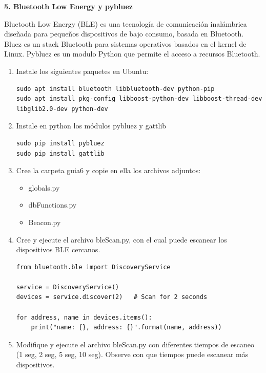 \documentclass[10pt,letterpaper]{article}
\begin{document}
\begin{center}
\textbf{5. Bluetooth Low Energy y pybluez}
\end{center}
Bluetooth Low Energy (BLE) es una tecnología de comunicación inalámbrica diseñada para pequeños dispositivos de bajo consumo, basada en Bluetooth. Bluez es un stack Bluetooth para sistemas operativos basados en el kernel de Linux. Pybluez es un modulo Python que permite el acceso a recursos Bluetooth. 

\begin{enumerate}

\item Instale los siguientes paquetes en Ubuntu:

\begin{verbatim}
sudo apt install bluetooth libbluetooth-dev python-pip
sudo apt install pkg-config libboost-python-dev libboost-thread-dev libglib2.0-dev python-dev
\end{verbatim}


\item Instale en python los módulos pybluez y gattlib
\begin{verbatim}
sudo pip install pybluez
sudo pip install gattlib
\end{verbatim}

\item Cree la carpeta guia6 y copie en ella los archivos adjuntos:
\begin{itemize}
\item globals.py
\item dbFunctions.py
\item Beacon.py
\end{itemize}


\item Cree y ejecute el archivo bleScan.py, con el cual puede escanear los dispositivos BLE cercanos. 
\begin{lstlisting}[style=myCustomPythonStyle]
from bluetooth.ble import DiscoveryService

service = DiscoveryService()
devices = service.discover(2)   # Scan for 2 seconds

for address, name in devices.items():
    print("name: {}, address: {}".format(name, address))
\end{lstlisting}

\item Modifique y ejecute el archivo bleScan.py con diferentes tiempos de escaneo (1 seg, 2 seg, 5 seg, 10 seg). Observe con que tiempos puede escanear más dispositivos. 


\end{enumerate}
\end{document}
